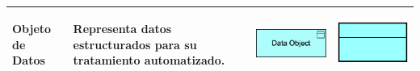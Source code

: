 {\begin{longtable}{|p{0.15\linewidth}|p{0.45\linewidth}|p{0.2\linewidth} p{0.2\linewidth}|}
    	
    	Objeto de Datos 
    	&
    	Representa datos estructurados para su tratamiento automatizado. 
    	&
    	\begin{center}
    		\includegraphics[width=1\linewidth]{imgs/aplication_dataObject.pdf}
    	\end{center} &
    	\begin{center}
    		\includegraphics[width=0.7\linewidth]{imgs/Data_object.pdf}
    	\end{center}
    	\\ \hline
    \end{longtable}
}